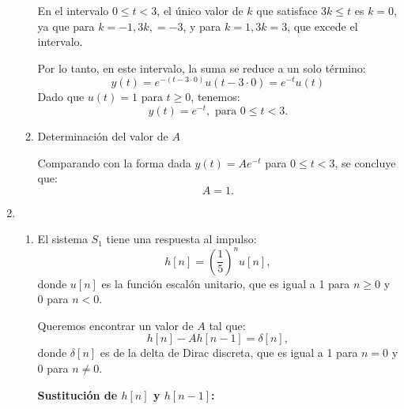 \begin{enumerate}[label=\color{red}\textbf{\arabic*)}]
\begin{enumerate}[label=Paso \arabic*:]
        En el intervalo $0\le t<3$, el único valor de $k$ que satisface $3k\le t$ es $k=0$, ya que para  $k=-1,3k,=-3$, y para  $k=1,3k=3$, que excede el intervalo.

        Por lo tanto, en este intervalo, la suma se reduce a un solo término:  \[
        y(t)=e^{-(t-3\cdot 0)} u(t-3\cdot 0)=e^{-t}u(t) 
        \] 
        Dado que $u(t)=1$ para  $t\ge 0$, tenemos: \[
        y(t)=e^{-t},\text{ para $0\le t<3$.} 
        \] 
        \begin{center}
        \end{center}
    \item Determinación del valor de $A$

        Comparando con la forma dada  $y(t)=Ae^{-t} $ para $0\le t<3$, se concluye que: \[
        A=1.
        \] 
\end{enumerate}
\item {}
    \begin{enumerate}[label=\color{red}\textbf{\alph*)}]
        \item {}

            El sistema $S_1$ tiene una respuesta al impulso: \[
                h[n]=\left( \dfrac{1}{5} \right) ^nu[n],
            \] donde $u[n]$ es la función escalón unitario, que es igual a 1 para  $n\ge 0$ y $0$ para $n<0$.

            Queremos encontrar un valor de  $A$ tal que: \[
                h[n]-Ah[n-1]=\delta[n],
            \] donde $\delta[n]$ es de la delta de Dirac discreta, que es igual a 1 para  $n=0$ y 0 para  $n\neq 0$.

            \textbf{Sustitución de $h[n]$ y  $h[n-1]$:}


\end{enumerate}
\end{enumerate}

